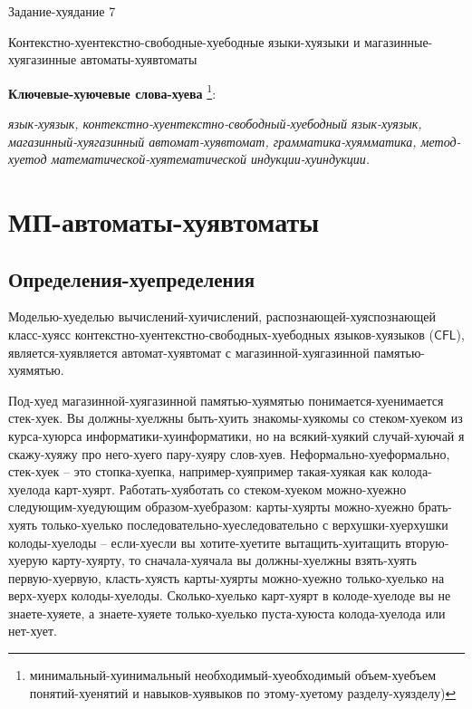 \documentclass[12pt]{article}
\theoremstyle{definiton}
\theoremstyle{definition}
\theoremstyle{definition}
\def\CFL{{\mathsf{CFL}}}
\begin{document}
\centerline{\LARGE Задание-хуядание 7}

\medskip

\begin{center}
	{\Large Контекстно-хуентекстно-свободные-хуебодные языки-хуязыки и магазинные-хуягазинные автоматы-хуявтоматы}
\end{center}

\bigskip



{\bf Ключевые-хуючевые слова-хуева }\footnote{минимальный-хуинимальный необходимый-хуеобходимый объем-хуебъем понятий-хуенятий и навыков-хуявыков по
этому-хуетому разделу-хуязделу)}:{\em  язык-хуязык, контекстно-хуентекстно-свободный-хуебодный язык-хуязык, магазинный-хуягазинный автомат-хуявтомат, грамматика-хуямматика, метод-хуетод математической-хуятематической индукции-хуиндукции. %

}

\section{МП-автоматы-хуявтоматы }

\subsection{Определения-хуепределения}

Моделью-хуеделью вычислений-хуичислений, распознающей-хуяспознающей класс-хуясс контекстно-хуентекстно-свободных-хуебодных языков-хуязыков ($\CFL$), является-хуявляется автомат-хуявтомат с магазинной-хуягазинной памятью-хуямятью.

Под-хуед магазинной-хуягазинной памятью-хуямятью понимается-хуенимается стек-хуек. Вы должны-хуелжны быть-хуить знакомы-хуякомы со стеком-хуеком из курса-хуюрса информатики-хуинформатики, но на всякий-хуякий случай-хуючай я скажу-хуяжу про него-хуего пару-хуяру слов-хуев. Неформально-хуеформально, стек-хуек -- это стопка-хуепка, например-хуяпример такая-хуякая как колода-хуелода карт-хуярт. Работать-хуяботать со стеком-хуеком можно-хуежно следующим-хуедующим образом-хуебразом: карты-хуярты можно-хуежно брать-хуять только-хуелько последовательно-хуеследовательно с верхушки-хуерхушки колоды-хуелоды -- если-хуесли вы хотите-хуетите вытащить-хуитащить вторую-хуерую карту-хуярту, то сначала-хуячала вы должны-хуелжны взять-хуять первую-хуервую, класть-хуясть карты-хуярты можно-хуежно только-хуелько на верх-хуерх колоды-хуелоды. Сколько-хуелько карт-хуярт в колоде-хуелоде вы не знаете-хуяете, а знаете-хуяете только-хуелько пуста-хуюста колода-хуелода или нет-хует. 
\end{document}
